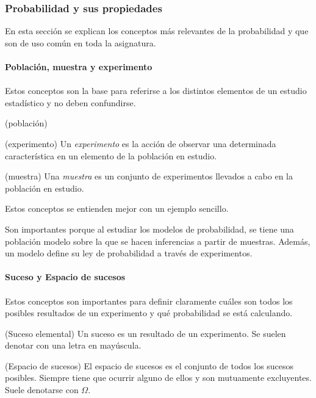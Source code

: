 \subsubsection{Probabilidad y sus propiedades}
En esta sección se explican los conceptos más relevantes de la probabilidad y que son de uso común en toda la asignatura.\\\\
\textbf{Población, muestra y experimento}\\\\
Estos conceptos son la base para referirse a los distintos elementos de un estudio estadístico y no deben confundirse.
\begin{definition}(población)

	\label{def:población}
\end{definition}
\begin{definition}(experimento)
Un \textit{experimento} es la acción de observar una determinada característica en un elemento de la población en estudio.
	\label{def:experimento}
\end{definition}
\begin{definition}(muestra)
Una \textit{muestra} es un conjunto de experimentos llevados a cabo en la población en estudio.
	\label{def:muestra}
\end{definition}
Estos conceptos se entienden mejor con un ejemplo sencillo.
\begin{example}

	\label{ex: población}
\end{example}
Son importantes porque al estudiar los modelos de probabilidad, se tiene una población modelo sobre la que se hacen inferencias a partir de muestras. Además, un modelo define su ley de probabilidad a través de experimentos.
\\\\\textbf{Suceso y Espacio de sucesos}\\\\
Estos conceptos son importantes para definir claramente cuáles son todos los posibles resultados de un experimento y qué probabilidad se está calculando.
\begin{definition}(Suceso elemental)
	Un suceso es un resultado de un experimento. Se suelen denotar con una letra en mayúscula.
	\label{def:suceso_el}
\end{definition}
\begin{definition}(Espacio de sucesos)
	El espacio de sucesos es el conjunto de todos los sucesos posibles. Siempre tiene que ocurrir alguno de ellos y son mutuamente excluyentes. Suele denotarse con $\Omega$.
	\label{def:espacio_sucesos}
\end{definition}
